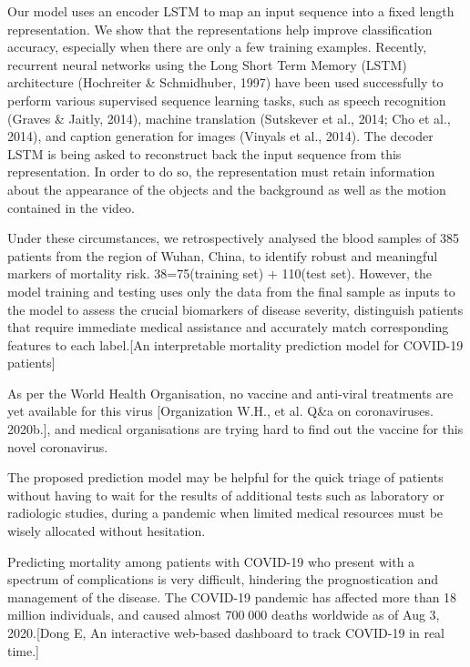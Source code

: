 Our model uses an encoder LSTM to map an input sequence into a ﬁxed length representation.
We show that the representations help improve classiﬁcation accuracy, especially when there are only a few training examples.
Recently, recurrent neural networks using the Long Short Term Memory (LSTM) architecture (Hochreiter & Schmidhuber, 1997) have been used successfully to perform various supervised sequence learning tasks, such as speech recognition (Graves & Jaitly, 2014), machine translation (Sutskever et al., 2014; Cho et al., 2014), and caption generation for images (Vinyals et al., 2014).
The decoder LSTM is being asked to reconstruct back the input sequence from this representation. In order to do so, the representation must retain information about the appearance of the objects and the background as well as the motion contained in the video.

Under these circumstances, we retrospectively analysed the blood samples of 385 patients from the region of Wuhan, China, to identify robust and meaningful markers of mortality risk. 38=75(training set) + 110(test set).
However, the model training and testing uses only the data from the final sample as inputs to the model to assess the crucial biomarkers of disease severity, distinguish patients that require immediate medical assistance and accurately match corresponding features to each label.[An interpretable mortality prediction model for COVID-19 patients]

As per the World Health Organisation, no vaccine and anti-viral treatments are yet available for this virus [Organization W.H., et al. Q&a on coronaviruses. 2020b.], and medical organisations are trying hard to find out the vaccine for this novel coronavirus.

The proposed prediction model may be helpful for the quick triage of patients without having to wait for the results of additional tests such as laboratory or radiologic studies, during a pandemic when limited medical resources must be wisely allocated without hesitation.

Predicting mortality among patients with COVID-19 who present with a spectrum of complications is very difficult, hindering the prognostication and management of the disease.
The COVID-19 pandemic has affected more than 18 million individuals, and caused almost 700 000 deaths worldwide as of Aug 3, 2020.[Dong E, An interactive web-based dashboard to track COVID-19 in real time.]

